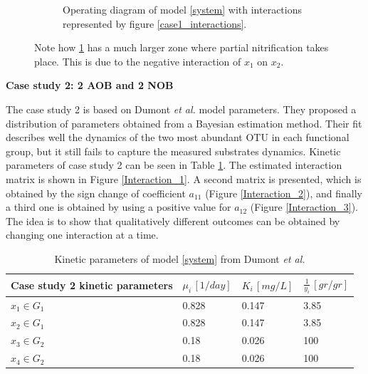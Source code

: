 \documentclass[processes,article,submit,moreauthors,pdftex]{Definitions/mdpi}
\begin{document}
\begin{figure}[h]
\begin{subfigure}[t]{0.45\textwidth}
		\caption{Operating diagram of model \eqref{system} with interactions represented by figure \ref{case1_interactions}.}
		\label{OD_interactions}
	\end{subfigure}
	\caption{Note how \ref{OD_interactions} has a much larger zone where partial nitrification takes place. This is due to the negative interaction of $x_1$ on $x_2$.}
	\label{OD_case_1}
\end{figure} 
\clearpage

\textbf{Case study 2: 2 AOB and 2 NOB}

The case study 2 is based on Dumont \textit{et al.} \cite{Dumont2016} model parameters. They proposed a distribution of parameters obtained from a Bayesian estimation method. Their fit describes well the dynamics of the two most abundant OTU in each functional group, but it still fails to capture the measured substrates dynamics. Kinetic parameters of case study 2 can be seen in Table \ref{kinetic_parameters}. The estimated interaction matrix is shown in Figure \ref{Interaction_1}. A second matrix is presented, which is obtained by the sign change of coefficient $a_{11}$ (Figure \ref{Interaction_2}), and finally a third one is obtained by using a positive value for $a_{12}$ (Figure \ref{Interaction_3}). The idea is to show that qualitatively different outcomes can be obtained by changing one interaction at a time.

\begin{table}[ht]
	\centering
	\begin{tabular}{|l|l|l|l|}
		\hline \rule{0pt}{3.5ex}
		Case study 2 kinetic parameters & $\mu_i\,[1/day]$ & $K_i\,[mg/L]$ & $\frac{1}{y_i} \, [gr/gr]$ \\ \hline 
		$x_1 \in G_1$ & 0.828  & 0.147 & 3.85  \\ \hline
		$x_2\in G_1$ &0.828   & 0.147 &  3.85\\ \hline
		$x_3\in G_2$ & 0.18 & 0.026 &  100 \\ \hline
		$x_4\in G_2$ & 0.18 & 0.026 &  100 \\ \hline
	\end{tabular}
	\caption{Kinetic parameters of model \eqref{system} from Dumont \textit{et al.} \cite{Dumont2016}}
	\label{kinetic_parameters}
\end{table}
\end{document}
